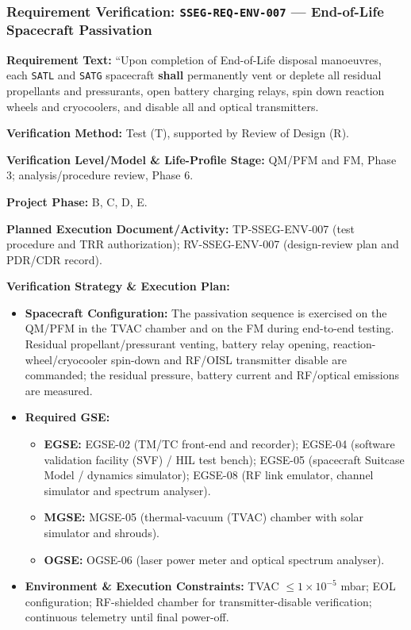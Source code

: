 \subsubsection{Requirement Verification: \texttt{SSEG-REQ-ENV-007} --- End-of-Life Spacecraft Passivation}
\label{ver:SSEG-REQ-ENV-007}
\textbf{Requirement Text:} ``Upon completion of End-of-Life disposal manoeuvres, each \texttt{SATL} and \texttt{SATG} spacecraft \textbf{shall} permanently vent or deplete all residual propellants and pressurants, open battery charging relays, spin down reaction wheels and cryocoolers, and disable all  and optical transmitters.
\par\textbf{Verification Method:} Test (T), supported by Review of Design (R).
\par\textbf{Verification Level/Model \& Life-Profile Stage:} QM/PFM and FM, Phase 3; analysis/procedure review, Phase 6.
\par\textbf{Project Phase:} B, C, D, E.
\par\textbf{Planned Execution Document/Activity:} TP-SSEG-ENV-007 (test procedure and TRR authorization); RV-SSEG-ENV-007 (design-review plan and PDR/CDR record).
\par\textbf{Verification Strategy \& Execution Plan:}
\begin{itemize}
\item \textbf{Spacecraft Configuration:} The passivation sequence is exercised on the QM/PFM in the TVAC chamber and on the FM during end-to-end testing. Residual propellant/pressurant venting, battery relay opening, reaction-wheel/cryocooler spin-down and RF/OISL transmitter disable are commanded; the residual pressure, battery current and RF/optical emissions are measured.
\item \textbf{Required GSE:}
\begin{itemize}
\item \textbf{EGSE:} EGSE-02 (TM/TC front-end and recorder); EGSE-04 (software validation facility (SVF) / HIL test bench); EGSE-05 (spacecraft Suitcase Model / dynamics simulator); EGSE-08 (RF link emulator, channel simulator and spectrum analyser).
\item \textbf{MGSE:} MGSE-05 (thermal-vacuum (TVAC) chamber with solar simulator and shrouds).
\item \textbf{OGSE:} OGSE-06 (laser power meter and optical spectrum analyser).
\end{itemize}
\item \textbf{Environment \& Execution Constraints:} TVAC $\le$$1\times10^{-5}$ mbar; EOL configuration; RF-shielded chamber for transmitter-disable verification; continuous telemetry until final power-off.
\end{itemize}
